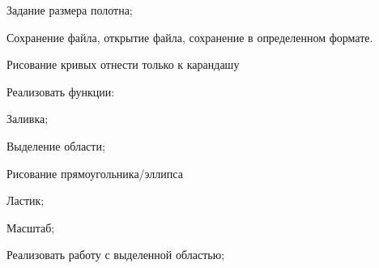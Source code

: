 
\begin{DoxyEnumerate}
\item Задание размера полотна;
\item Сохранение файла, открытие файла, сохранение в определенном формате.
\item Рисование кривых отнести только к карандашу
\item Реализовать функции\+:
\begin{DoxyItemize}
\item Заливка;
\item Выделение области;
\item Рисование прямоугольника/эллипса
\item Ластик;
\item Масштаб;
\end{DoxyItemize}
\item Реализовать работу с выделенной областью; 
\end{DoxyEnumerate}
